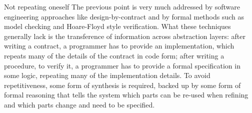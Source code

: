 \begin{subparagraph}{Not repeating oneself}
The previous point is very much addressed by software engineering approaches
like design-by-contract and by formal methods such as model checking and Hoare-Floyd
style verification.
What these techniques generally lack is the transference of information across
abstraction layers:
after writing a contract, a programmer has to provide an implementation,
which repeats many of the details of the contract in code form;
after writing a procedure, to verify it, a programmer has to provide a formal
specification in some logic, repeating many of the implementation details.
To avoid repetitiveness, some form of synthesis is required, backed up by some
form of formal reasoning that tells the system which parts can be re-used when
refining and which parts change and need to be specified.
\end{subparagraph}

